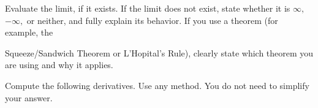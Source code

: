 \documentclass[addpoints,12pt]{exam}
\begin{document}
\begin{questions}


\question Evaluate the limit, if it exists. If the limit does not exist, state whether it is $\infty,$
$-\infty,$ or neither, and fully explain its behavior. If you use a theorem (for example, the

Squeeze/Sandwich Theorem or L'Hopital's Rule), clearly state which theorem you are using and
why it applies.


\newpage




\question Compute the following derivatives. Use any method. You do not need to simplify your
answer.

\begin{parts}

\end{parts}
\end{questions}
\end{document}
